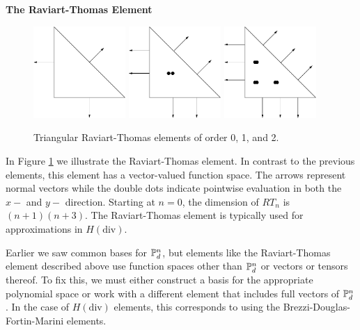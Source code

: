 \begin{example}{\bf{The Raviart-Thomas Element}} \\
\begin{figure}[htb]
 \includegraphics[height=3.5cm]{chapters/kirby-1/eps/RT0.xfig.eps} \hspace{0.5cm}
 \includegraphics[height=3.5cm]{chapters/kirby-1/eps/RT1.xfig.eps} \hspace{0.5cm}
 \includegraphics[height=3.5cm]{chapters/kirby-1/eps/RT2.xfig.eps}
\caption{Triangular Raviart-Thomas elements of order 0, 1, and 2.}
\label{Raviart-Thomas}
\end{figure}
In Figure \ref{Raviart-Thomas} we illustrate the Raviart-Thomas element. 
In contrast to the previous elements, this element has a vector-valued
function space.  The arrows represent normal vectors while the double
dots indicate pointwise 
evaluation in both the $x-$ and $y-$ direction.  Starting at \( n = 0
\), the dimension of \( RT_n \) is \( (n+1)(n+3) \). The Raviart-Thomas
element is typically used for approximations in $H(\mathrm{div})$.
\end{example}

\begin{remark}
Earlier we saw common bases for $\P^n_d$, but 
elements like the Raviart-Thomas element described above use function
spaces other than \( \P^n_d \) or vectors or tensors thereof.  To fix
this, we must either construct a basis for the appropriate polynomial
space or work with a different element that includes full vectors of 
$\P^n_d$.  In the case of \( H(\mathrm{div}) \) elements, this
corresponds to using the Brezzi-Douglas-Fortin-Marini elements.
\end{remark}


